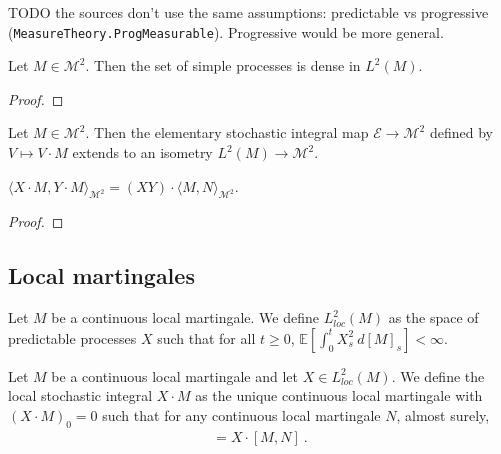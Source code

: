 TODO the sources don't use the same assumptions: predictable vs progressive (\texttt{MeasureTheory.ProgMeasurable}). Progressive would be more general.


\begin{lemma}\label{lem:dense_simpleProcess}
Let $M \in \mathcal{M}^2$. Then the set of simple processes is dense in $L^2(M)$.
\end{lemma}

\begin{proof}

\end{proof}


\begin{definition}\label{def:itoIsometry}
Let $M \in \mathcal{M}^2$. Then the elementary stochastic integral map $\mathcal{E} \to \mathcal{M}^2$ defined by $V \mapsto V \cdot M$ extends to an isometry $L^2(M) \to \mathcal{M}^2$.
\end{definition}


\begin{lemma}\label{lem:inner_itoIsometry}
$\langle X \cdot M, Y \cdot M \rangle_{\mathcal{M}^2} = (XY) \cdot \langle M, N \rangle_{\mathcal{M}^2}$.
\end{lemma}

\begin{proof}

\end{proof}


\subsection{Local martingales}

\begin{definition}[$L^2_{loc}(M)$]\label{def:L2locM}
Let $M$ be a continuous local martingale.
We define $L^2_{loc}(M)$ as the space of predictable processes $X$ such that for all $t \ge 0$, $\mathbb{E}\left[ \int_0^t X_s^2 \: d[M]_s \right] < \infty$.
\end{definition}


\begin{definition}\label{def:locStochIntegral}
Let $M$ be a continuous local martingale and let $X \in L^2_{loc}(M)$.
We define the local stochastic integral $X \cdot M$ as the unique continuous local martingale with $(X \cdot M)_0 = 0$ such that for any continuous local martingale $N$, almost surely,
\begin{align*}
  [X \cdot M, N] = X \cdot [M, N]
  \: .
\end{align*}
\end{definition}


